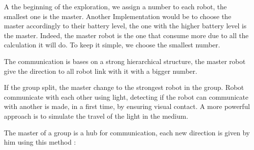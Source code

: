 \documentclass[main.tex]{subfiles}
\begin{document}
A the beginning of the exploration, we assign a number to each robot, the smallest one is the master. Another Implementation would be to choose the master accordingly to their battery level, the one with the higher battery level is the master. Indeed, the master robot is the one that consume more due to all the calculation it will do. To keep it simple, we choose the smallest number.

The communication is bases on a strong hierarchical structure, the master robot give the direction to all robot link with it with a bigger number.

If the group split, the master change to the strongest robot in the group.
Robot communicate with each other using light, detecting if the robot can communicate with another is made, in a first time, by ensuring visual contact. A more powerful approach is to simulate the travel of the light in the medium.

The master of a group is a hub for communication, each new direction is given by him using this method :
\end{document}
